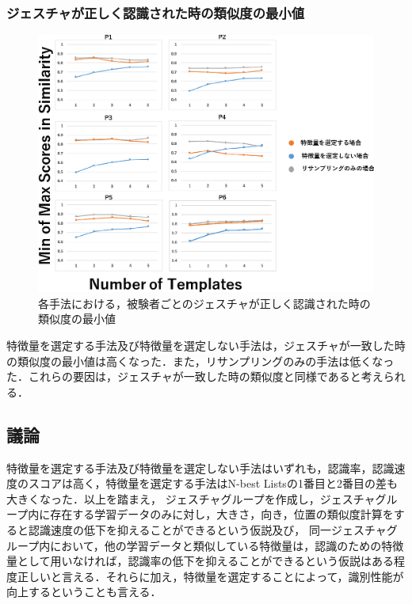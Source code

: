 \subsubsection{ジェスチャが正しく認識された時の類似度の最小値}
\begin{figure}[!h]
\centering
\includegraphics[width=1.0\columnwidth]{img/pre_min.eps}
\caption{各手法における，被験者ごとのジェスチャが正しく認識された時の類似度の最小値}
\label{fig:rare_rec}
\end{figure}

特徴量を選定する手法及び特徴量を選定しない手法は，ジェスチャが一致した時の類似度の最小値は高くなった．また，リサンプリングのみの手法は低くなった．これらの要因は，ジェスチャが一致した時の類似度と同様であると考えられる．

\subsection{議論}

特徴量を選定する手法及び特徴量を選定しない手法はいずれも，認識率，認識速度のスコアは高く，特徴量を選定する手法はN-best Listsの1番目と2番目の差も大きくなった．以上を踏まえ，
ジェスチャグループを作成し，ジェスチャグループ内に存在する学習データのみに対し，大きさ，向き，位置の類似度計算をすると認識速度の低下を抑えることができるという仮説及び，
同一ジェスチャグループ内において，他の学習データと類似している特徴量は，認識のための特徴量として用いなければ，認識率の低下を抑えることができるという仮説はある程度正しいと言える．それらに加え，特徴量を選定することによって，識別性能が向上するということも言える．

